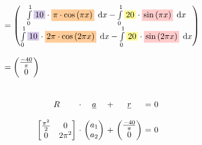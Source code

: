 \documentclass[
final,
a4paper,
oneside,
parskip=full,
headings=standardclasses,
headings=big,
pointednumbers,
fleqn
]{scrartcl}
\newcommand{\tfillo}[1]{\tfillc[#1][orange!40]}
\newcommand{\tfilly}[1]{\tfillc[#1][yellow!40]}
\newcommand{\tfillr}[1]{\tfillc[#1][red!20]}
\newcommand{\tfillv}[1]{\tfillc[#1][Violet!20]}
\newcommand*\difx{\; \mathop{}\!\mathrm{d}x}
\newcommand{\f}[2]{\frac{#1}{#2}}
\newcommand{\kl}[1]{{\left( #1 \right)}}
\begin{document}
{\begin{align*}
\begin{array}{ll}
            & \\
            & = \begin{pmatrix}
                \int\limits_{0}^{1}{\tfillv{$10$}       \cdot \tfillo{$\pi \cdot \cos\kl{\pi x}$} \difx} -
                \int\limits_{0}^{1}{\tfilly{$20$}      \cdot \tfillr{$\sin\kl{\pi x}$} \difx} \\
                \int\limits_{0}^{1}{\tfillv{$10$}       \cdot \tfillo{$2 \pi \cdot \cos\kl{2 \pi x}$} \difx} -
                \int\limits_{0}^{1}{\tfilly{$20$}      \cdot \tfillr{$\sin\kl{2 \pi x}$} \difx}
            \end{pmatrix} \\
            & \\
            & = \begin{pmatrix}
                \f{-40}{\pi} \\
                0
            \end{pmatrix}
        \end{array}
    \end{align*}} \\
    {\setlength{\abovedisplayskip}{6pt}
    \setlength{\belowdisplayskip}{-12pt}
    \begin{align*}
        \begin{array}{c@{\ }c@{\ }c@{\ }c@{\ }c@{\ }c@{\ }l}
            R & \cdot & \uline{a} & + & \uline{r} & = & 0 \\
            \\
            \begin{bmatrix}
                \f{\pi^2}{2} & 0 \\
                0             & 2\pi^2
            \end{bmatrix} & \cdot &
            \begin{pmatrix}
                a_1 \\
                a_2
            \end{pmatrix} & + &
            \begin{pmatrix}
                \f{-40}{\pi} \\
                0
            \end{pmatrix} & = & 0
            \\
        \end{array}
    \end{align*}} \\
\end{document}
